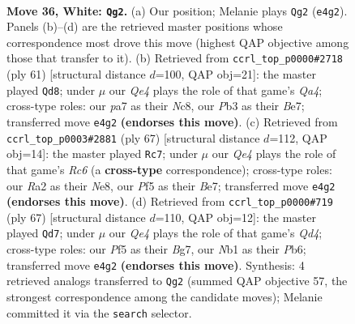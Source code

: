 \documentclass[11pt]{article}
\begin{document}
\clearpage

\begin{figure}[p]\centering
\begin{subfigure}{0.46\textwidth}\centering
\resizebox{\linewidth}{!}{%
\newchessgame
\chessboard[
  setfen={1qb3k1/p2n1r1p/1r3b2/2p2P2/Pp1pQ3/1P4N1/R3P3/1NBK1R2 w - - 3 36},
  showmover=false,
  pgfstyle=straightmove, color=movearrow, markmove={e4-g2}
]}
\caption{}
\end{subfigure}\hfill
\begin{subfigure}{0.46\textwidth}\centering
\resizebox{\linewidth}{!}{%
\newchessgame
\chessboard[
  setfen={2n4r/4bpk1/r3p2p/q2pP2p/2pP4/2P2N2/2RB1PP1/3QR1K1 b - - 1 31},
  showmover=false,
  pgfstyle=straightmove, color=movearrow, markmove={a5-d8}
]}
\caption{}
\end{subfigure}
\\[4pt]
\begin{subfigure}{0.46\textwidth}\centering
\resizebox{\linewidth}{!}{%
\newchessgame
\chessboard[
  setfen={4nr1k/4b1pp/1p2Pp2/5P2/qp1P2R1/2r1N3/6BP/4QR1K b - - 1 34},
  showmover=false,
  pgfstyle=straightmove, color=movearrow, markmove={c3-c7}
]}
\caption{}
\end{subfigure}\hfill
\begin{subfigure}{0.46\textwidth}\centering
\resizebox{\linewidth}{!}{%
\newchessgame
\chessboard[
  setfen={2r3k1/5pb1/1pr1n1p1/3q3p/1B1pN2P/P2P2P1/5P2/1R1QR1K1 b - - 5 34},
  showmover=false,
  pgfstyle=straightmove, color=movearrow, markmove={d5-d7}
]}
\caption{}
\end{subfigure}
\caption{\textbf{Move 36, White: \texttt{Qg2}.} (a) Our position; Melanie plays \texttt{Qg2} (\texttt{e4g2}). Panels (b)--(d) are the retrieved master positions whose correspondence most drove this move (highest QAP objective among those that transfer to it). (b) Retrieved from \texttt{ccrl\_top\_p0000\#2718} (ply 61) [structural distance $d$=100, QAP obj=21]: the master played \texttt{Qd8}; under $\mu$ our \emph{Qe4} plays the role of that game's \emph{Qa4}; cross-type roles: our \emph{p}a7 as their \emph{N}c8, our \emph{P}b3 as their \emph{B}e7; transferred move \texttt{e4g2} \textbf{(endorses this move)}. (c) Retrieved from \texttt{ccrl\_top\_p0003\#2881} (ply 67) [structural distance $d$=112, QAP obj=14]: the master played \texttt{Rc7}; under $\mu$ our \emph{Qe4} plays the role of that game's \emph{Rc6} (a \textbf{cross-type} correspondence); cross-type roles: our \emph{R}a2 as their \emph{N}e8, our \emph{P}f5 as their \emph{B}e7; transferred move \texttt{e4g2} \textbf{(endorses this move)}. (d) Retrieved from \texttt{ccrl\_top\_p0000\#719} (ply 67) [structural distance $d$=110, QAP obj=12]: the master played \texttt{Qd7}; under $\mu$ our \emph{Qe4} plays the role of that game's \emph{Qd4}; cross-type roles: our \emph{P}f5 as their \emph{B}g7, our \emph{N}b1 as their \emph{P}b6; transferred move \texttt{e4g2} \textbf{(endorses this move)}. Synthesis: 4 retrieved analogs transferred to \texttt{Qg2} (summed QAP objective 57, the strongest correspondence among the candidate moves); Melanie committed it via the \texttt{search} selector.}
\label{fig:thought-m70}
\end{figure}
\end{document}
